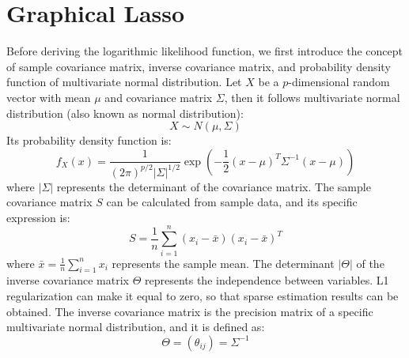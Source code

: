 \chapter{Graphical Lasso}
Before deriving the logarithmic likelihood function, we first introduce the concept of sample covariance matrix, inverse covariance matrix, and probability density function of multivariate normal distribution.
Let $X$ be a $p$-dimensional random vector with mean $\mu$ and covariance matrix $\Sigma$, then it follows multivariate normal distribution (also known as normal distribution): $$
	X \sim N(\mu, \Sigma)
$$ Its probability density function is: $$
	f_X(x) = \frac{1}{(2\pi)^{p/2} |\Sigma|^{1/2}} \exp\left(-\frac{1}{2}(x-\mu)^T \Sigma^{-1} (x-\mu)\right)
$$ where $|\Sigma|$ represents the determinant of the covariance matrix.
The sample covariance matrix $S$ can be calculated from sample data, and its specific expression is: $$
	S = \frac{1}{n} \sum_{i=1}^n (x_i - \bar{x})(x_i - \bar{x})^T
$$ where $\bar{x}=\frac{1}{n} \sum_{i=1}^n x_i$ represents the sample mean.
The determinant $|\Theta|$ of the inverse covariance matrix $\Theta$ represents the independence between variables. L1 regularization can make it equal to zero, so that sparse estimation results can be obtained. The inverse covariance matrix is the precision matrix of a specific multivariate normal distribution, and it is defined as: $$
	\Theta = (\theta_{ij}) = \Sigma^{-1}
$$
